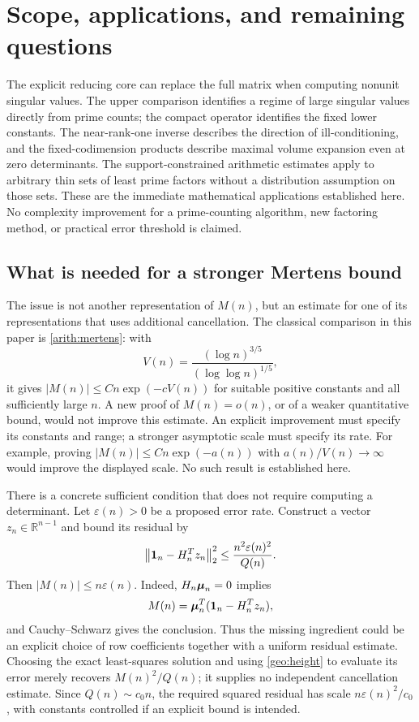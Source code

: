 \section{Scope, applications, and remaining questions}\label{sec:discussion}

The explicit reducing core can replace the full matrix when computing nonunit singular values. The upper comparison identifies a regime of large singular values directly from prime counts; the compact operator identifies the fixed lower constants. The near-rank-one inverse describes the direction of ill-conditioning, and the fixed-codimension products describe maximal volume expansion even at zero determinants. The support-constrained arithmetic estimates apply to arbitrary thin sets of least prime factors without a distribution assumption on those sets. These are the immediate mathematical applications established here. No complexity improvement for a prime-counting algorithm, new factoring method, or practical error threshold is claimed.

\subsection{What is needed for a stronger Mertens bound}\label{disc:mertens-improvement}

The issue is not another representation of $M(n)$, but an estimate for one of its representations that uses additional cancellation. The classical comparison in this paper is \eqref{arith:mertens}: with
\[
 V(n)=\frac{(\log n)^{3/5}}{(\log\log n)^{1/5}},
\]
it gives $|M(n)|\le Cn\exp(-cV(n))$ for suitable positive constants and all sufficiently large $n$. A new proof of $M(n)=o(n)$, or of a weaker quantitative bound, would not improve this estimate. An explicit improvement must specify its constants and range; a stronger asymptotic scale must specify its rate. For example, proving $|M(n)|\le Cn\exp(-a(n))$ with $a(n)/V(n)\to\infty$ would improve the displayed scale. No such result is established here.

There is a concrete sufficient condition that does not require computing a determinant. Let $\varepsilon(n)>0$ be a proposed error rate. Construct a vector $z_n\in\mathbb R^{n-1}$ and bound its residual by
\begin{equation}\label{disc:certificate}
 \left\lVert\mathbf{1}_n-H_n^Tz_n\right\rVert_2^2
 \le \frac{n^2\varepsilon(n)^2}{Q(n)}.
\end{equation}
Then $|M(n)|\le n\varepsilon(n)$. Indeed, $H_n\boldsymbol{\mu}_n=0$ implies
\[
 M(n)=\boldsymbol{\mu}_n^T(\mathbf{1}_n-H_n^Tz_n),
\]
and Cauchy--Schwarz gives the conclusion. Thus the missing ingredient could be an explicit choice of row coefficients together with a uniform residual estimate. Choosing the exact least-squares solution and using \eqref{geo:height} to evaluate its error merely recovers $M(n)^2/Q(n)$; it supplies no independent cancellation estimate. Since $Q(n)\sim c_0n$, the required squared residual has scale $n\varepsilon(n)^2/c_0$, with constants controlled if an explicit bound is intended.


